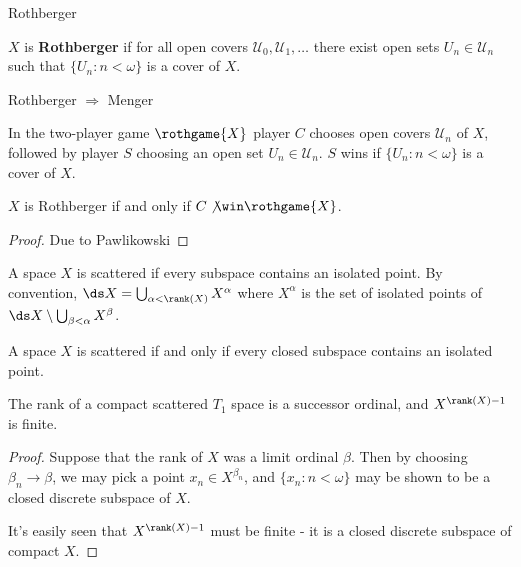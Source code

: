 \newpage

  \centerline{Rothberger}

  \begin{defn}
    $X$ is \textbf{Rothberger} if for all open covers $\mathcal{U}_0,\mathcal{U}_1,\dots$ there exist open sets $U_n\in \mathcal{U}_n$ such that $\{U_n:n<\omega\}$ is a cover of $X$.
  \end{defn}

  \begin{prop}
    Rothberger $\Rightarrow$ Menger
  \end{prop}

  \begin{defn}
    In the two-player game $\rothgame{X}$ player $C$ chooses open covers $\mathcal{U}_n$ of $X$, followed by player $S$ choosing an open set $U_n\in\mathcal{U}_n$. $S$ wins if $\{U_n:n<\omega\}$ is a cover of $X$.
  \end{defn}

  \begin{thm}
    $X$ is Rothberger if and only if $C\not\win\rothgame{X}$.
  \end{thm}

  \begin{proof}
    Due to Pawlikowski
  \end{proof}

  \begin{defn}
    A space $X$ is scattered if every subspace contains an isolated point. By convention, $\ds X = \bigcup_{\alpha<\rank(X)}X^\alpha$ where $X^\alpha$ is the set of isolated points of $\ds X\setminus\bigcup_{\beta<\alpha}X^\beta$.
  \end{defn}

  \begin{prop}
    A space $X$ is scattered if and only if every closed subspace contains an isolated point.
  \end{prop}

  \begin{prop}
    The rank of a compact scattered $T_1$ space is a successor ordinal, and $X^{\rank(X)-1}$ is finite.
  \end{prop}

  \begin{proof}
    Suppose that the rank of $X$ was a limit ordinal $\beta$. Then by choosing $\beta_n\to\beta$, we may pick a point $x_n\in X^{\beta_n}$, and $\{x_n: n<\omega\}$ may be shown to be a closed discrete subspace of $X$.

    It's easily seen that $X^{\rank(X)-1}$ must be finite - it is a closed discrete subspace of compact $X$.
  \end{proof}

